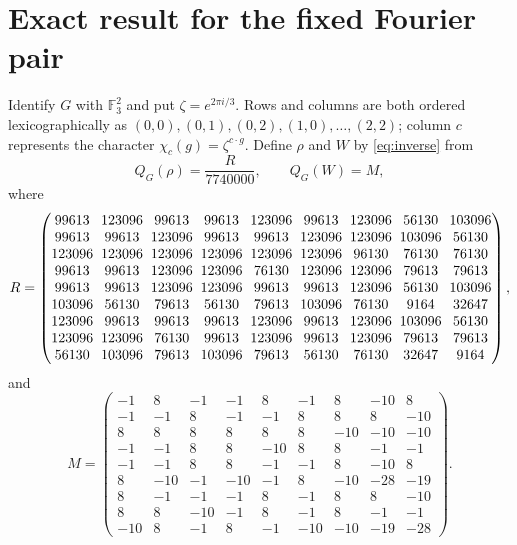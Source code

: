 \documentclass[11pt,a4paper]{article}
\theoremstyle{definition}
\theoremstyle{plain}
\newcommand{\F}{\mathbb F}
\begin{document}
\section{Exact result for the fixed Fourier pair}
Identify $G$ with $\F_3^2$ and put $\zeta=e^{2\pi i/3}$. Rows and columns
are both ordered lexicographically as
$(0,0),(0,1),(0,2),(1,0),\ldots,(2,2)$; column $c$ represents the character
$\chi_c(g)=\zeta^{c\cdot g}$.
Define $\rho$ and $W$ by \eqref{eq:inverse} from
\begin{equation}\label{eq:Rdef}
 Q_G(\rho)=\frac{R}{7740000},\qquad Q_G(W)=M,
\end{equation}
where
\begin{equation}\label{eq:R}
\begingroup\setlength{\arraycolsep}{2.8pt}
R=\begin{pmatrix}
99613&123096&99613&99613&123096&99613&123096&56130&103096\\
99613&99613&123096&99613&99613&123096&123096&103096&56130\\
123096&123096&123096&123096&123096&123096&96130&76130&76130\\
99613&99613&123096&123096&76130&123096&123096&79613&79613\\
99613&99613&123096&123096&99613&99613&123096&56130&103096\\
103096&56130&79613&56130&79613&103096&76130&9164&32647\\
123096&99613&99613&99613&123096&99613&123096&103096&56130\\
123096&123096&76130&99613&123096&99613&123096&79613&79613\\
56130&103096&79613&103096&79613&56130&76130&32647&9164
\end{pmatrix},
\endgroup
\end{equation}
and
\begin{equation}\label{eq:M}
M=\begin{pmatrix}
-1&8&-1&-1&8&-1&8&-10&8\\
-1&-1&8&-1&-1&8&8&8&-10\\
8&8&8&8&8&8&-10&-10&-10\\
-1&-1&8&8&-10&8&8&-1&-1\\
-1&-1&8&8&-1&-1&8&-10&8\\
8&-10&-1&-10&-1&8&-10&-28&-19\\
8&-1&-1&-1&8&-1&8&8&-10\\
8&8&-10&-1&8&-1&8&-1&-1\\
-10&8&-1&8&-1&-10&-10&-19&-28
\end{pmatrix}.
\end{equation}
\end{document}

